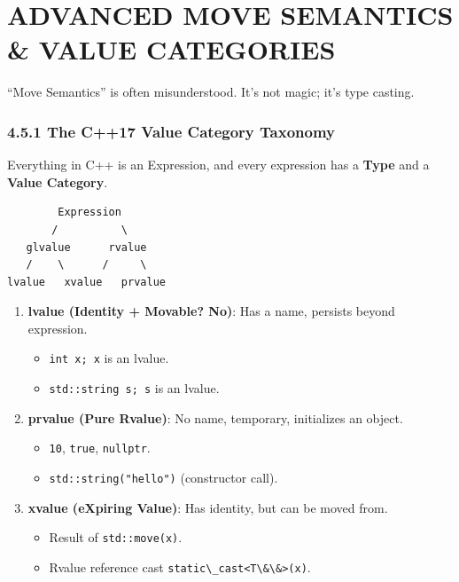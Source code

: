 \hypertarget{advanced-move-semantics-value-categories}{%
\chapter{ADVANCED MOVE SEMANTICS \& VALUE
CATEGORIES}\label{advanced-move-semantics-value-categories}}

``Move Semantics'' is often misunderstood. It's not magic; it's type
casting.

\hypertarget{the-c17-value-category-taxonomy}{%
\subsection{4.5.1 The C++17 Value Category
Taxonomy}\label{the-c17-value-category-taxonomy}}

Everything in C++ is an Expression, and every expression has a
\textbf{Type} and a \textbf{Value Category}.

\begin{lstlisting}
        Expression
       /          \
   glvalue      rvalue
   /    \      /     \
lvalue   xvalue   prvalue
\end{lstlisting}

\begin{enumerate}
\def\labelenumi{\arabic{enumi}.}
\tightlist
\item
  \textbf{lvalue (Identity + Movable? No)}: Has a name, persists beyond
  expression.

  \begin{itemize}
  \tightlist
  \item
    \passthrough{\lstinline!int x; x!} is an lvalue.
  \item
    \passthrough{\lstinline!std::string s; s!} is an lvalue.
  \end{itemize}
\item
  \textbf{prvalue (Pure Rvalue)}: No name, temporary, initializes an
  object.

  \begin{itemize}
  \tightlist
  \item
    \passthrough{\lstinline!10!}, \passthrough{\lstinline!true!},
    \passthrough{\lstinline!nullptr!}.
  \item
    \passthrough{\lstinline!std::string("hello")!} (constructor call).
  \end{itemize}
\item
  \textbf{xvalue (eXpiring Value)}: Has identity, but can be moved from.

  \begin{itemize}
  \tightlist
  \item
    Result of \passthrough{\lstinline!std::move(x)!}.
  \item
    Rvalue reference cast
    \passthrough{\lstinline!static\_cast<T\&\&>(x)!}.
  \end{itemize}
\end{enumerate}


